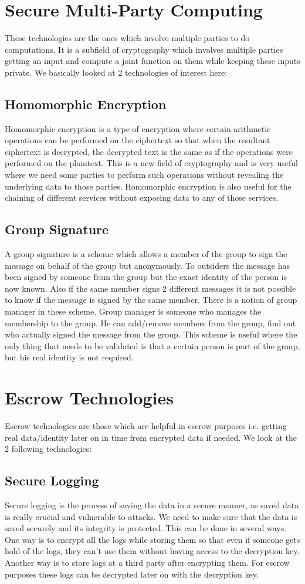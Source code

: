 \section{Secure Multi-Party Computing}
These technologies are the ones which involve multiple parties to do computations. It is a subfield of cryptography which involves multiple parties getting an input and compute a joint function on them while keeping these inputs private. We basically looked at 2 technologies of interest here:
\subsection{Homomorphic Encryption}
Homomorphic encryption is a type of encryption where certain arithmetic operations can be performed on the ciphertext so that when the resultant ciphertext is decrypted, the decrypted text is the same as if the operations were performed on the plaintext. This is a new field of cryptography and is very useful where we need some parties to perform such operations without revealing the underlying data to those parties. Homomorphic encryption is also useful for the chaining of different services without exposing data to any of those services.
\subsection{Group Signature}
A group signature is a scheme which allows a member of the group to sign the message on behalf of the group but anonymously. To outsiders the message has been signed by someone from the group but the exact identity of the person is now known. Also if the same member signs 2 different messages it is not possible to know if the message is signed by the same member. There is a notion of group manager in these scheme. Group manager is someone who manages the membership to the group. He can add/remove members from the group, find out who actually signed the message from the group. This scheme is useful where the only thing that needs to be validated is that a certain person is part of the group, but his real identity is not required.
\section{Escrow Technologies}
Escrow technologies are those which are helpful in escrow purposes i.e. getting real data/identity later on in time from encrypted data if needed. We look at the 2 following technologies:
\subsection{Secure Logging}
Secure logging is the process of saving the data in a secure manner, as saved data is really crucial and vulnerable to attacks. We need to make sure that the data is saved securely and its integrity is protected. This can be done in several ways. One way is to encrypt all the logs while storing them so that even if someone gets hold of the logs, they can't use them without having access to the decryption key. Another way is to store logs at a third party after encrypting them. For escrow purposes these logs can be decrypted later on with the decryption key.

